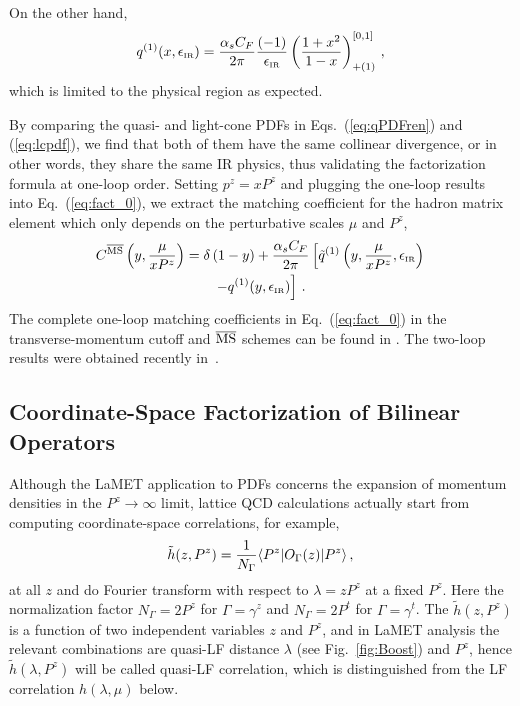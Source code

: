 \documentclass[aps,rmp,reprint,amsmath,amssymb,graphicx,longbibliography]{revtex4-1} %
\newcommand{\MS}{{\overline{\rm MS}}}
\newcommand{\beq}{\begin{eqnarray}}
\newcommand{\eeq}{\end{eqnarray}}
\newcommand{\nn}{\nonumber}
\DeclareRobustCommand{\eq}[1]{Eq.~(\ref{eq:#1})}
\DeclareRobustCommand{\eqs}[2]{Eqs.~(\ref{eq:#1}) and (\ref{eq:#2})}
\DeclareRobustCommand{\fig}[1]{Fig.~\ref{fig:#1}}
\begin{document}
On the other hand,
\beq\label{eq:lcpdf}
q^{(1)}(x,\epsilon_{\mbox{\tiny IR}}) ={\alpha_sC_F\over 2\pi} {(-1)\over \epsilon_{\mbox{\tiny IR}}} \left({1+x^2\over 1-x}\right)^{[0,1]}_{+(1)}\,,
\eeq
which is limited to the physical region as expected.

By comparing the quasi- and light-cone PDFs in \eqs{qPDFren}{lcpdf}, we find that both of them have the same collinear divergence,  or in other words, they share the same IR physics, thus validating the factorization formula at one-loop order. Setting $p^z=xP^z$ and plugging the one-loop results into \eq{fact_0}, we extract the matching coefficient for the hadron matrix element which only depends on the perturbative scales $\mu$ and $P^z$,
\begin{align}\label{eq:msbarmatching}
	C^{\MS}\left(y, {\mu\over xP^z}\right) &= \delta\left(1-y\right) + {\alpha_sC_F\over 2\pi}\left[\tilde q^{(1)}\left(y,{\mu\over xP^z}, \epsilon_{\mbox{\tiny IR}}\right)\right.\nn\\
	&\qquad\left.-q^{(1)}(y,\epsilon_{\mbox{\tiny IR}})\right]\,.
\end{align}
The complete one-loop matching coefficients in \eq{fact_0} in the transverse-momentum cutoff and $\MS$ schemes can be found in \cite{Wang:2017qyg,Wang:2017eel,Wang:2019tgg}. The two-loop results were obtained recently in~\cite{Chen:2020arf,Chen:2020iqi,Chen:2020ody,Li:2020xml}.

\subsection{Coordinate-Space Factorization of Bilinear Operators}
\label{sec:renorm-coord}
Although the LaMET application to PDFs concerns the expansion of momentum densities
in the $P^z\to\infty$ limit, lattice QCD calculations actually start from
computing coordinate-space correlations, for example,
\beq
\tilde h(z, P^z) = {1\over N_\Gamma}\langle P^z| O_\Gamma(z) |P^z\rangle\,,
\eeq
at all $z$ and do Fourier transform with respect
to $\lambda=zP^z$ at a fixed $P^z$. Here the normalization factor $N_\Gamma=2P^z$ for $\Gamma=\gamma^z$ and $N_\Gamma=2P^t$ for $\Gamma=\gamma^t$.
The $\tilde h(z,P^z)$ is a function of two independent
variables $z$ and $P^z$, and in LaMET analysis the relevant
combinations are quasi-LF distance $\lambda$ (see \fig{Boost}) and $P^z$, hence
$\tilde h(\lambda, P^z)$ will be called quasi-LF correlation, which is distinguished from the LF correlation $h(\lambda,\mu)$ below.
\end{document}

